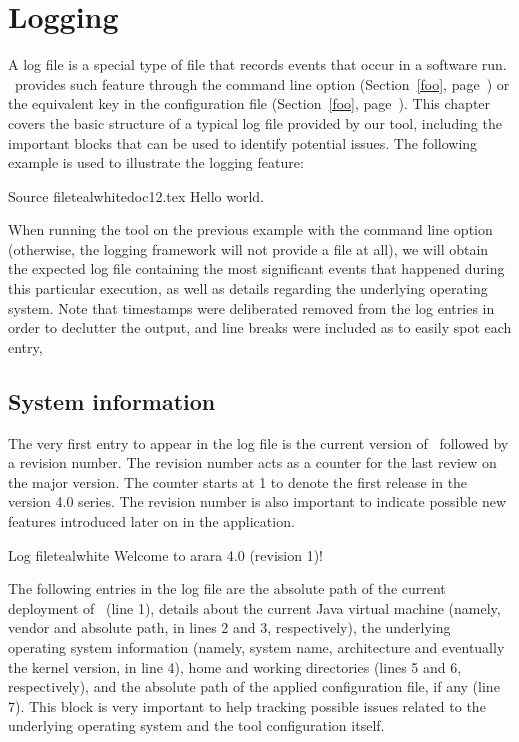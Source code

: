 \chapter{Logging}
\label{chap:logging}

A log file is a special type of file that records events that occur in a software run. \arara\ provides such feature through the  command line option (Section~\ref{foo}, page~\pageref{foo}) or the equivalent key in the configuration file (Section~\ref{foo}, page~\pageref{foo}). This chapter covers the basic structure of a typical log file provided by our tool, including the important blocks that can be used to identify potential issues. The following example is used to illustrate the logging feature:

\begin{ncodebox}{Source file}{teal}{\icnote}{white}{doc12.tex}
Hello world.
\bye
\end{ncodebox}

When running the tool on the previous example with the  command line option (otherwise, the logging framework will not provide a file at all), we will obtain the expected  log file containing the most significant events that happened during this particular execution, as well as details regarding the underlying operating system. Note that timestamps were deliberated removed from the log entries in order to declutter the output, and line breaks were included as to easily spot each entry,

\section{System information}
\label{sec:systeminformation}

The very first entry to appear in the log file is the current version of \arara\ followed by a revision number. The revision number acts as a counter for the last review on the major version. The counter starts at 1 to denote the first release in the version 4.0 series. The revision number is also important to indicate possible new features introduced later on in the application.

\begin{codebox}{Log file}{teal}{\icnote}{white}
Welcome to arara 4.0 (revision 1)!
\end{codebox}

The following entries in the log file are the absolute path of the current deployment of \arara\ (line 1), details about the current Java virtual machine (namely, vendor and absolute path, in lines 2 and 3, respectively), the underlying operating system information (namely, system name, architecture and eventually the kernel version, in line 4), home and working directories (lines 5 and 6, respectively), and the absolute path of the applied configuration file, if any (line 7). This block is very important to help tracking possible issues related to the underlying operating system and the tool configuration itself.

